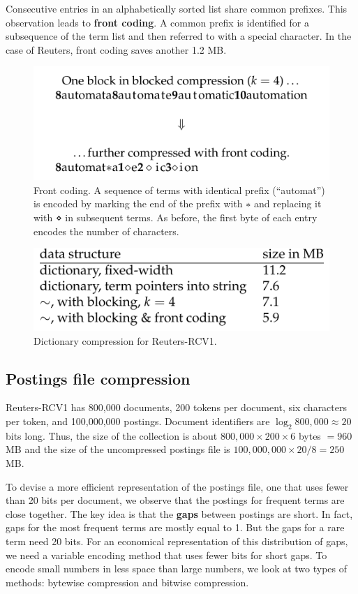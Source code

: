 \documentclass[letterpaper,11pt]{article}
\begin{document}
Consecutive entries in an alphabetically sorted list share common prefixes. This observation leads to \textbf{front coding}. A common prefix is identified for a subsequence of the term list and then referred to with a special character. In the case of Reuters, front coding saves another 1.2 MB.
\begin{figure}[H]
    \centering
    \includegraphics[scale=0.60]{sect5/figure_5_7.png}
    \caption{Front coding. A sequence of terms with identical prefix (“automat”) is encoded by marking the end of the prefix with $∗$ and replacing it with ⋄ in subsequent terms. As before, the first byte of each entry encodes the number of characters.}
\end{figure}
\begin{figure}[H]
    \centering
    \includegraphics[scale=0.60]{sect5/table_5_2.png}
    \caption{Dictionary compression for Reuters-RCV1.}
\end{figure}

\subsection{Postings file compression}
Reuters-RCV1 has 800,000 documents, 200 tokens per document, six characters per token, and 100,000,000 postings. Document identifiers are $\log_2 800,000\approx20$ bits long. Thus, the size of the collection is about $800,000\times200\times6$ bytes $= 960$ MB and the size of the uncompressed postings file is $100,000,000\times20/8 = 250$ MB.

To devise a more efficient representation of the postings file, one that uses fewer than 20 bits per document, we observe that the postings for frequent terms are close together. The key idea is that the \textbf{gaps} between postings are short. In fact, gaps for the most frequent terms are mostly equal to 1. But the gaps for a rare term need 20 bits. For an economical representation of this distribution of gaps, we need a variable encoding method that uses fewer bits for short gaps. To encode small numbers in less space than large numbers, we look at two types of methods: bytewise compression and bitwise compression.
\end{document}
